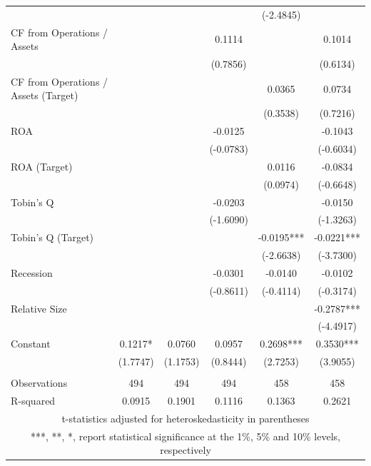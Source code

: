 \documentclass[12pt]{article}
\begin{document}
\begin{appendices}
\begin{table}[!htbp]
\begin{adjustbox}{max width=\textwidth}
\begin{tabular}{lccccc}
			&  &  &  & (-2.4845) &  \\
		   CF from Operations / Assets &  &  & 0.1114 &  & 0.1014 \\
			&  &  & (0.7856) &  & (0.6134) \\
		   CF from Operations / Assets (Target) &  &  &  & 0.0365 & 0.0734 \\
			&  &  &  & (0.3538) & (0.7216) \\
		   ROA &  &  & -0.0125 &  & -0.1043 \\
			&  &  & (-0.0783) &  & (-0.6034) \\
		   ROA (Target) &  &  &  & 0.0116 & -0.0834 \\
			&  &  &  & (0.0974) & (-0.6648) \\
		   Tobin's Q &  &  & -0.0203 &  & -0.0150 \\
			&  &  & (-1.6090) &  & (-1.3263) \\
		   Tobin's Q (Target) &  &  &  & -0.0195*** & -0.0221*** \\
			&  &  &  & (-2.6638) & (-3.7300) \\
		   Recession &  &  & -0.0301 & -0.0140 & -0.0102 \\
			&  &  & (-0.8611) & (-0.4114) & (-0.3174) \\
		   Relative Size &  &  &  &  & -0.2787*** \\
			&  &  &  &  & (-4.4917) \\
		   Constant & 0.1217* & 0.0760 & 0.0957 & 0.2698*** & 0.3530*** \\
			& (1.7747) & (1.1753) & (0.8444) & (2.7253) & (3.9055) \\
			&  &  &  &  &  \\
		   Observations & 494 & 494 & 494 & 458 & 458 \\
			R-squared & 0.0915 & 0.1901 & 0.1116 & 0.1363 & 0.2621 \\ \hline
			\multicolumn{6}{c}{ t-statistics adjusted for heteroskedasticity in parentheses} \\
			\multicolumn{6}{c}{ ***, **, *, report statistical significance at the 1\%, 5\% and 10\% levels, respectively}\\
		   \end{tabular}			  
	\end{adjustbox}
\end{table}


\end{appendices}
\end{document}
